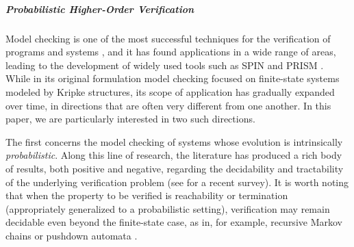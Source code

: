 
\subparagraph*{Probabilistic Higher-Order Verification}




Model checking is one of the most successful techniques for the verification of programs and systems \cite{APT1986307, 10.1145/1592761.1592781}, and it has found applications in a wide range of areas, leading to the development of widely used tools such as SPIN \cite{10.1109/32.588521} and PRISM \cite{10.5555/647810.738106}. While in its original formulation model checking focused on finite-state systems modeled by Kripke structures, its scope of application has gradually expanded over time, in directions that are often very different from one another. In this paper, we are particularly interested in two such directions.

The first concerns the model checking of systems whose evolution is intrinsically \emph{probabilistic}. Along this line of research, the literature has produced a rich body of results, both positive and negative, regarding the decidability and tractability of the underlying verification problem (see \cite{Katoen} for a recent survey). It is worth noting that when the property to be verified is reachability or termination (appropriately generalized to a probabilistic setting), verification may remain decidable even beyond the finite-state case, as in, for example, recursive Markov chains \cite{10.1145/2159531.2159534} or pushdown automata \cite{10.5555/1018438.1021838}.

